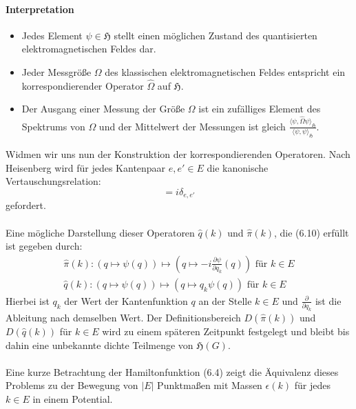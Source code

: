 \documentclass[11pt,a4paper,leqno]{report}
\numberwithin{equation}{chapter}
\begin{document}
\paragraph{Interpretation}
\begin{itemize}
\item Jedes Element $\psi\in\mathfrak{H}$ stellt einen m\"oglichen Zustand des quantisierten elektromagnetischen Feldes dar. 
\item Jeder Messgr\"o\ss{}e $\Omega$ des klassischen elektromagnetischen Feldes entspricht ein korrespondierender Operator $\hat{\Omega}$ auf $\mathfrak{H}$. 
\item Der Ausgang einer Messung der Gr\"o\ss{}e $\Omega$ ist ein zuf\"alliges Element des Spektrums von $\Omega$ und der Mittelwert der Messungen ist gleich $\frac{\langle \psi, \hat{\Omega}\psi\rangle_{\mathfrak{H}}}{\langle \psi, \psi\rangle_{\mathfrak{H}}}$.
\end{itemize}
\noindent
Widmen wir uns nun der Konstruktion der korrespondierenden Operatoren. Nach Heisenberg wird f\"ur jedes Kantenpaar $e,e'\in E$ die kanonische Vertauschungsrelation:
\begin{equation}
	[\hat{q}(e), \hat{\pi}(e')] = i\delta_{e, e'}
\end{equation}
gefordert.\\
\\
Eine m\"ogliche Darstellung dieser Operatoren $\hat{q}(k)$ und $\hat{\pi}(k)$, die (6.10) erf\"ullt ist gegeben durch:
\begin{align}
	\hat{\pi}(k):(q\mapsto\psi(q)) \mapsto (q\mapsto -i\frac{\partial\psi}{\partial q_k}(q))\text{  f\"ur }k\in E\\
	\hat{q}(k):(q\mapsto\psi(q)) \mapsto (q\mapsto q_k\psi(q))\text{  f\"ur }k\in E
\end{align}
\noindent
Hierbei ist $q_k$ der Wert der Kantenfunktion $q$ an der Stelle $k\in E$ und $\frac{\partial}{\partial q_k}$ ist die Ableitung nach demselben Wert. Der Definitionsbereich $D(\hat{\pi}(k))$ und $D(\hat{q}(k))$ f\"ur $k\in E$ wird zu einem sp\"ateren Zeitpunkt festgelegt und bleibt bis dahin eine unbekannte dichte Teilmenge von $\mathfrak{H}(G)$.
\\
\\
Eine kurze Betrachtung der Hamiltonfunktion (6.4) zeigt die \"Aquivalenz dieses Problems zu der Bewegung von $|E|$ Punktma\ss{}en mit Massen $\epsilon(k)$ f\"ur jedes $k\in E$ in einem Potential. 
\end{document}
